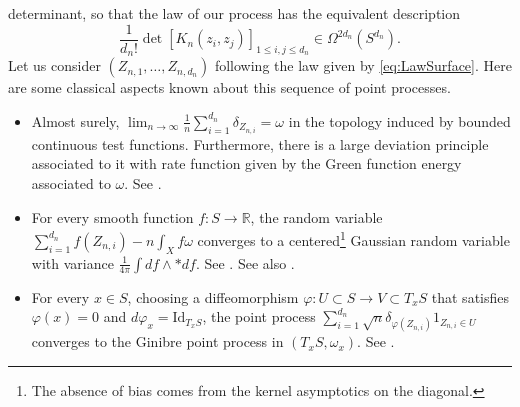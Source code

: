\documentclass[10pt,reqno]{amsart}
\numberwithin{equation}{section}
\numberwithin{figure}{section}
\theoremstyle{plain}
\newcommand{\<}{\langle}
\renewcommand{\>}{\rangle}
\begin{document}
determinant, so that the law of our process
has the equivalent description
\begin{equation}
\label{eq:LawSurface}
\frac{1}{d_n!}\det{[K_n(z_i,z_j)]}_{1\leq i,j\leq d_n}
\in \Omega^{2d_n}(S^{d_n}).
\end{equation}
Let us consider $(Z_{n,1},\dots,Z_{n,d_n})$
following the law given by \eqref{eq:LawSurface}.
Here are some classical aspects known about
this sequence of point processes.
\begin{itemize}
\item Almost surely, $\lim_{n \to \infty} \frac{1}{n}
\sum_{i=1}^{d_n} \delta_{Z_{n,i}}
= \omega$ in the topology
induced by bounded continuous test functions.
Furthermore, there is a large deviation 
principle associated to it
with rate function given by
the Green function energy associated
to $\omega$. See \cite{BermanLDP}.
    \item
For every smooth function $f:S \to \mathbb R$,
the random variable
$\sum_{i=1}^{d_n} f(Z_{n,i})
- n \int_X f \omega$
converges to a centered\footnote{The absence
of bias comes from the kernel asymptotics on the diagonal.} Gaussian random variable
with variance
$\frac{1}{4\pi}\int df \wedge *df$.
See \cite{10.1007/978-3-030-01588-6_5}. See also \cite{bourgoin}.
    \item 
For every $x \in S$, choosing
a diffeomorphism $\varphi: U \subset S \to V \subset 
T_x S$ that satisfies $\varphi(x) = 0$ and
$d \varphi_x = \mathrm{Id}_{T_x S}$,
the point process $\sum_{i=1}^{d_n} \sqrt{n} 
\delta_{\varphi(Z_{n,i})} 1_{Z_{n,i} \in U}$
converges to the Ginibre point process
in $(T_xS, \omega_x)$. See
\cite{10.1007/978-3-030-01588-6_5}.
\end{itemize}
\end{document}
